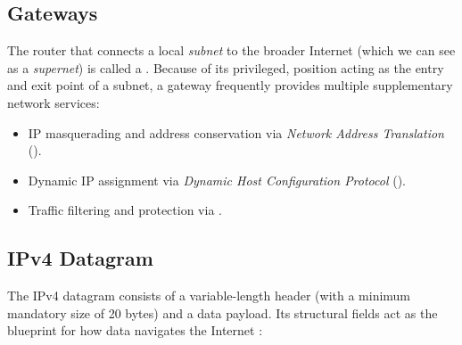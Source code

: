 \subsection{Gateways}
The router that connects a local \emph{subnet} to the broader Internet (which we can see as a \emph{supernet}) is called a . 
Because of its privileged, position acting as the entry and exit point of a subnet, a gateway frequently provides multiple supplementary network services:
\begin{itemize}
    \item IP masquerading and address conservation via \emph{Network Address Translation} ().
    \item Dynamic IP assignment via \emph{Dynamic Host Configuration Protocol} ().
    \item Traffic filtering and protection via .
\end{itemize}

\subsection{IPv4 Datagram}
The IPv4 datagram consists of a variable-length header (with a minimum mandatory size of 20 bytes) and a data payload. Its structural fields act as the blueprint for how data navigates the Internet \cite{rfc791}:

